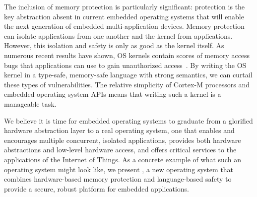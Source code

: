 The inclusion of memory protection is particularly significant: protection is
the key abstraction absent in current embedded operating systems that will
enable the next generation of embedded multi-application devices. Memory
protection can isolate applications from one another and the kernel from
applications. However, this isolation and safety is only as good as the kernel
itself. As numerous recent results have shown, OS kernels contain scores of
memory access bugs that applications can use to gain unauthorized
access~\cite{nickolai}. By writing the OS kernel in a type-safe, memory-safe
language with strong semantics, we can curtail these types of vulnerabilities.
The relative simplicity of Cortex-M processors and embedded operating system
APIs means that writing such a kernel is a manageable task.

We believe it is time for embedded operating systems to graduate from  a
glorified hardware abstraction layer to a real operating system, one that
enables and encourages multiple concurrent, isolated applications, provides both
hardware abstractions and low-level hardware access, and offers critical
services to the applications of the Internet of Things. As a concrete example
of what such an operating system might look like, we present \name, a new
operating system that combines hardware-based memory protection and
language-based safety to provide a secure, robust platform for embedded
applications.

%
